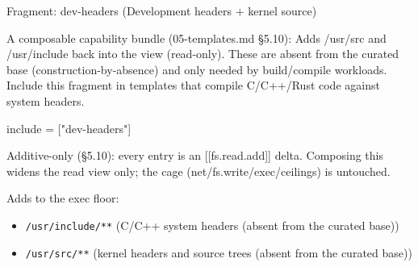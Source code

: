 Fragment: dev-headers (Development headers + kernel source)

A composable capability bundle (05-templates.md §5.10): Adds /usr/src
and /usr/include back into the view (read-only). These are absent from
the curated base (construction-by-absence) and only needed by
build/compile workloads. Include this fragment in templates that compile
C/C++/Rust code against system headers.

\begin{kennelcode}
include = ["dev-headers"]
\end{kennelcode}

Additive-only (§5.10): every entry is an {[}{[}fs.read.add{]}{]} delta.
Composing this widens the read view only; the cage
(net/fs.write/exec/ceilings) is untouched.

Adds to the exec floor:

\begin{itemize}
\tightlist
\item
  \texttt{/usr/include/**} (C/C++ system headers (absent from the
  curated base))
\item
  \texttt{/usr/src/**} (kernel headers and source trees (absent from the
  curated base))
\end{itemize}
